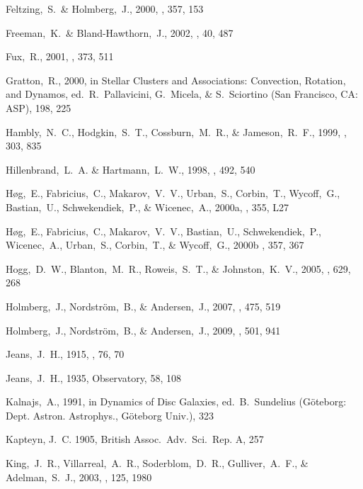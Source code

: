 \begin{thebibliography}{99}
  Feltzing,~S.~\& Holmberg,~J., 2000,
  \aap, 357, 153

  Freeman,~K.~\& Bland-Hawthorn,~J., 2002,
  \araa, 40, 487

  Fux,~R., 2001,
  \aap, 373, 511

  Gratton,~R., 2000,
  in Stellar Clusters and Associations: Convection, Rotation, and Dynamos,
  ed.~R.~Pallavicini, G.~Micela, \& S.~Sciortino (San Francisco, CA: ASP),
  198, 225

  Hambly,~N.~C., Hodgkin,~S.~T., Cossburn,~M.~R., \& Jameson,~R.~F., 1999,
  \mnras, 303, 835

  Hillenbrand,~L.~A. \& Hartmann,~L.~W., 1998,
  \apj, 492, 540

  H{\o}g,~E., Fabricius,~C., Makarov,~V.~V., Urban,~S., Corbin,~T., Wycoff,~G., Bastian,~U., Schwekendiek,~P., \& Wicenec,~A., 2000a,
  \aap, 355, L27

  H{\o}g,~E., Fabricius,~C., Makarov,~V.~V., Bastian,~U., Schwekendiek,~P., Wicenec,~A., Urban,~S., Corbin,~T., \& Wycoff,~G., 2000b
    \aap, 357, 367

  Hogg,~D.~W., Blanton,~M.~R., Roweis,~S.~T., \& Johnston,~K.~V., 2005,
  \apj, 629, 268

  Holmberg,~J., Nordstr\"{o}m,~B., \& Andersen,~J., 2007,
  \aap, 475, 519

  Holmberg,~J., Nordstr\"{o}m,~B., \& Andersen,~J., 2009,
  \aap, 501, 941

  Jeans,~J.~H., 1915,
  \mnras, 76, 70

  Jeans,~J.~H., 1935,
  Observatory, 58, 108

  Kalnajs,~A., 1991, in Dynamics of Disc Galaxies, ed.~B.~Sundelius (G\"{o}teborg: Dept. Astron. Astrophys., G\"{o}teborg Univ.), 323

{Kapteyn}, J.~C. 1905, {British Assoc.~Adv.~Sci.~Rep.} A, 257

  King,~J.~R., Villarreal,~A.~R., Soderblom,~D.~R., Gulliver,~A.~F., \& Adelman,~S.~J., 2003,
  \aj, 125, 1980


\end{thebibliography}

